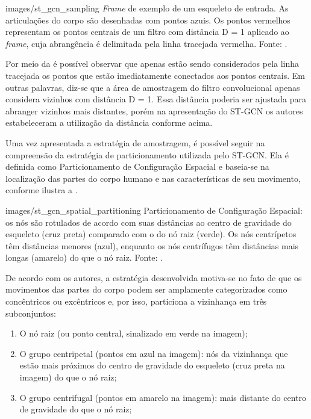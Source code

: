     {images/st_gcn_sampling}
    {\textit{Frame} de exemplo de um esqueleto de entrada. As articulações do corpo são desenhadas com pontos azuis. Os pontos vermelhos representam os pontos centrais de um filtro com distância D = 1 aplicado ao \textit{frame}, cuja abrangência é delimitada pela linha tracejada vermelha. Fonte: \cite[p. 5]{st-gcn-2018}.}

Por meio da  é possível observar que apenas estão sendo considerados pela linha tracejada os pontos que estão imediatamente conectados aos pontos centrais. Em outras palavras, diz-se que a área de amostragem do filtro convolucional apenas considera vizinhos com distância D = 1. Essa distância poderia ser ajustada para abranger vizinhos mais distantes, porém na apresentação do ST-GCN \cite{st-gcn-2018} os autores estabeleceram a utilização da distância conforme acima.

Uma vez apresentada a estratégia de amostragem, é possível seguir na compreensão da estratégia de particionamento utilizada pelo ST-GCN. Ela é definida como Particionamento de Configuração Espacial e baseia-se na localização das partes do corpo humano e nas características de seu movimento, conforme ilustra a .

    {images/st_gcn_spatial_partitioning}
    {Particionamento de Configuração Espacial: os nós são rotulados de acordo com suas distâncias ao centro de gravidade do esqueleto (cruz preta) comparado com o do nó raiz (verde). Os nós centrípetos têm distâncias menores (azul), enquanto os nós centrífugos têm distâncias mais longas (amarelo) do que o nó raiz. Fonte: \cite[p. 5]{st-gcn-2018}.}

De acordo com os autores, a estratégia desenvolvida motiva-se no fato de que os movimentos das partes do corpo podem ser amplamente categorizados como concêntricos ou excêntricos e, por isso, particiona a vizinhança em três subconjuntos:

\begin{enumerate}
    \item O nó raiz (ou ponto central, sinalizado em verde na imagem);
    \item O grupo centripetal (pontos em azul na imagem): nós da vizinhança que estão mais próximos do centro de gravidade do esqueleto (cruz preta na imagem) do que o nó raiz;
    \item O grupo centrifugal (pontos em amarelo na imagem): mais distante do centro de gravidade do que o nó raiz;
\end{enumerate}

